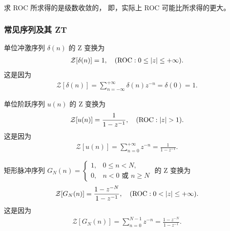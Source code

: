 \begin{note}
    求 ROC 所求得的是级数收敛的，
    即，实际上 ROC 可能比所求得的更大。
\end{note}

\subsubsection{常见序列及其 ZT}

\begin{example}[单位冲激序列的 ZT]
    单位冲激序列 $\delta(n)$ 的 Z 变换为
    \begin{align*}
        \mathcal{Z}[\delta(n)] = 1, \quad (\text{ROC}: 0 \le \left|z\right| \le +\infty).
    \end{align*}
    这是因为
    \begin{align*}
        \mathcal{Z}[\delta(n)] = \sum_{n=-\infty}^{+\infty} \delta(n) z^{-n} = \delta(0) = 1.
    \end{align*}
\end{example}

\begin{example}[单位阶跃序列的 ZT]
    单位阶跃序列 $u(n)$ 的 Z 变换为
    \begin{align*}
        \mathcal{Z}[u(n)] = \frac{1}{1 - z^{-1}}, \quad (\text{ROC}: \left|z\right| > 1).
    \end{align*}
    这是因为
    \begin{align*}
        \mathcal{Z}[u(n)] = \sum_{n=0}^{+\infty} z^{-n} = \frac{1}{1 - z^{-1}}.
    \end{align*}
\end{example}

\begin{example}[矩形脉冲序列的 ZT]
    矩形脉冲序列 $G_N(n) = \begin{cases}
        1, & 0 \le n < N, \\
        0, & n < 0 \text{ 或 } n \ge N
    \end{cases}$ 的 Z 变换为
    \begin{align*}
        \mathcal{Z}[G_N(n)] = \frac{1 - z^{-N}}{1 - z^{-1}}, \quad (\text{ROC}: 0 < \left|z\right| \le +\infty).
    \end{align*}
    这是因为
    \begin{align*}
        \mathcal{Z}[G_N(n)] = \sum_{n=0}^{N-1} z^{-n} = \frac{1 - z^{-N}}{1 - z^{-1}}.
    \end{align*}
\end{example}

